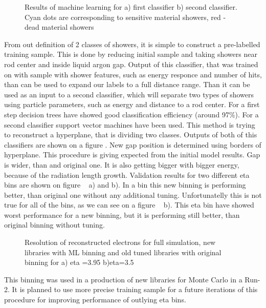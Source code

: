 \begin{figure}[h]
\begin{minipage}[h]{0.49\linewidth}
\end{minipage}
\hfill
\begin{minipage}[h]{0.49\linewidth}
\end{minipage}
\caption{Results of machine learning for a) first classifier b) second classifier. Cyan dots are corresponding to sensitive material showers, red - dead material showers}
\label{fig:Class}
\end{figure}


From out definition of 2 classes of showers, it is simple to construct a pre-labelled training sample. This is done by reducing initial sample and taking showers near rod center and inside liquid argon gap. Output of this classifier, that was trained on with sample with shower features, such as energy responce and number of hits, than can be used to expand our labels to a full distance range. Than it can be used as an input to a second classifier, which will separate two types of showers using particle parameters, such as energy and distance to a rod center. For a first step decision trees have showed good classification efficiency (around 97\%). For a second classifier support vector machines have been used. This method is trying to reconstruct a hyperplane, that is dividing two classes. Outputs of both of this classifiers are shown on a figure . New gap position is determined using borders of hyperplane. This procedure is giving expected from the initial model results. Gap is wider, than and original one. It is also getting bigger with bigger energy, because of the radiation length growth. 
Validation results for two different eta bins are shown on figure ~ a) and b). In a bin this new binning is performing better, than original one without any additional tuning. Unfortunatelly this is not true for all of the bins, as we can see on a figure ~ b). This eta bin have showed worst performance for a new binning, but it is performing still better, than original binning without tuning.

\begin{figure}[h]
\begin{minipage}[h]{0.49\linewidth}
\end{minipage}
\hfill
\begin{minipage}[h]{0.49\linewidth}
\end{minipage}
\caption{Resolution of reconstructed electrons for full simulation, new libraries with ML binning and old tuned libraries with original binning for a) eta =3.95 b)eta=3.5 }
\label{fig:Class}
\end{figure}

This binning was used in a production of new libraries for Monte Carlo in a Run-2. It is planned to use more precise training sample for a future iterations of this procedure for improving performance of outlying eta bins.
